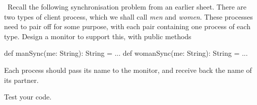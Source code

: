 \begin{question}\label{Q:menWomenM}
\Programming\ 
Recall the following synchronisation problem from an earlier sheet.  There are
two types of client process, which we shall call \emph{men} and \emph{women}.
These processes need to pair off for some purpose, with each pair containing
one process of each type.  Design a monitor to support this, with public
methods
\begin{scala}
  def manSync(me: String): String = ...
  def womanSync(me: String): String = ...
\end{scala}
Each process should pass its name to the monitor, and receive back the name of
its partner.

Test your code.
\end{question}


